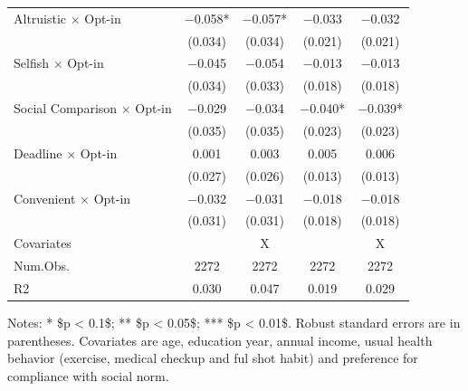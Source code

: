 \documentclass[
]{article}
\begin{document}
\begin{table}
\begin{threeparttable}
\begin{tabular}[t]{lcccc}
Altruistic $\times$ Opt-in & \num{-0.058}* & \num{-0.057}* & \num{-0.033} & \num{-0.032}\\
 & (\num{0.034}) & (\num{0.034}) & (\num{0.021}) & (\num{0.021})\\
Selfish $\times$ Opt-in & \num{-0.045} & \num{-0.054} & \num{-0.013} & \num{-0.013}\\
 & (\num{0.034}) & (\num{0.033}) & (\num{0.018}) & (\num{0.018})\\
Social Comparison $\times$ Opt-in & \num{-0.029} & \num{-0.034} & \num{-0.040}* & \num{-0.039}*\\
 & (\num{0.035}) & (\num{0.035}) & (\num{0.023}) & (\num{0.023})\\
Deadline $\times$ Opt-in & \num{0.001} & \num{0.003} & \num{0.005} & \num{0.006}\\
 & (\num{0.027}) & (\num{0.026}) & (\num{0.013}) & (\num{0.013})\\
Convenient $\times$ Opt-in & \num{-0.032} & \num{-0.031} & \num{-0.018} & \num{-0.018}\\
 & (\num{0.031}) & (\num{0.031}) & (\num{0.018}) & (\num{0.018})\\
\midrule
Covariates &  & X &  & X\\
Num.Obs. & \num{2272} & \num{2272} & \num{2272} & \num{2272}\\
R2 & \num{0.030} & \num{0.047} & \num{0.019} & \num{0.029}\\
\bottomrule
\end{tabular}
\begin{tablenotes}
\item Notes: * \$p < 0.1\$; ** \$p < 0.05\$; *** \$p < 0.01\$. Robust standard errors are in parentheses. Covariates are age, education year, annual income, usual health behavior (exercise, medical checkup and ful shot habit) and preference for compliance with social norm.
\end{tablenotes}
\end{threeparttable}
\end{table}
\end{document}
